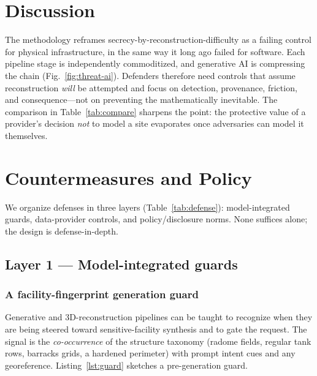 \documentclass[conference]{IEEEtran}
\begin{document}
\section{Discussion}
\label{sec:discussion}
The methodology reframes secrecy-by-reconstruction-difficulty as a failing control
for physical infrastructure, in the same way it long ago failed for software. Each
pipeline stage is independently commoditized, and generative AI is compressing the
chain (Fig.~\ref{fig:threat-ai}). Defenders therefore need controls that assume
reconstruction \emph{will} be attempted and focus on detection, provenance,
friction, and consequence---not on preventing the mathematically inevitable. The
comparison in Table~\ref{tab:compare} sharpens the point: the protective value of a
provider's decision \emph{not} to model a site evaporates once adversaries can
model it themselves.

\section{Countermeasures and Policy}
\label{sec:counter}
We organize defenses in three layers (Table~\ref{tab:defense}): model-integrated
guards, data-provider controls, and policy/disclosure norms. None suffices alone;
the design is defense-in-depth.

\subsection{Layer 1 --- Model-integrated guards}

\subsubsection{A facility-fingerprint generation guard}
Generative and 3D-reconstruction pipelines can be taught to recognize when they are
being steered toward sensitive-facility synthesis and to gate the request. The
signal is the \emph{co-occurrence} of the structure taxonomy (radome fields,
regular tank rows, barracks grids, a hardened perimeter) with prompt intent cues
and any georeference. Listing~\ref{lst:guard} sketches a pre-generation guard.
\end{document}
